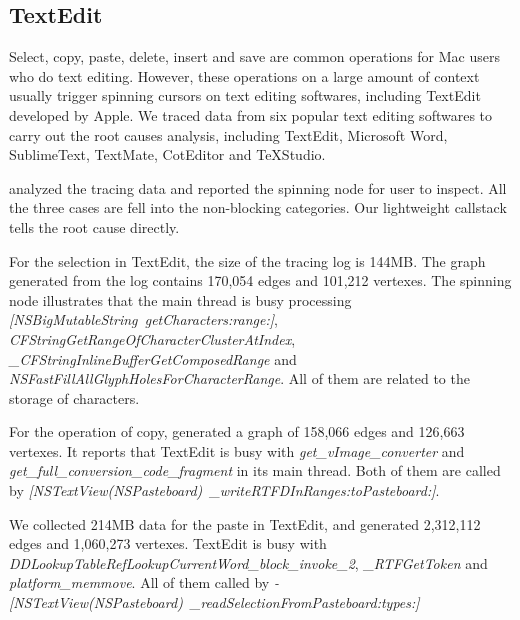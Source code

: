 \subsection{TextEdit}

Select, copy, paste, delete, insert and save are common operations for Mac
users who do text editing. However, these operations on a large amount of
context usually trigger spinning cursors on text editing softwares, including
TextEdit developed by Apple.  We traced data from six popular text editing
softwares to carry out the root causes analysis, including TextEdit, Microsoft
Word, SublimeText, TextMate, CotEditor and TeXStudio.

\xxx analyzed the tracing data and reported the spinning node for user to
inspect.  All the three cases are fell into the non-blocking categories.  Our
lightweight callstack tells the root cause directly.

For the selection in TextEdit, the size of the tracing log is 144MB.  The graph
generated from the log contains 170,054 edges and 101,212 vertexes.  The
spinning node illustrates that the main thread is busy processing
\textit{[NSBigMutableString\ getCharacters:range:]},
\textit{CFStringGetRangeOfCharacterClusterAtIndex},
\textit{\_CFStringInlineBufferGetComposedRange} and
\textit{NSFastFillAllGlyphHolesForCharacterRange}.  All of them are related to
the storage of characters.

For the operation of copy, \xxx generated a graph of 158,066 edges and 126,663
vertexes.  It reports that TextEdit is busy with
\textit{get\_vImage\_converter} and
\textit{get\_full\_conversion\_code\_fragment} in its main thread.  Both of
them are called by \textit{[NSTextView(NSPasteboard)\
\_writeRTFDInRanges:toPasteboard:]}.

We collected 214MB data for the paste in TextEdit, and generated 2,312,112
edges and 1,060,273 vertexes. TextEdit is busy with
\textit{DDLookupTableRefLookupCurrentWord\_block\_invoke\_2},
\textit{\_RTFGetToken} and \textit{platform\_memmove}. All of them called by
\textit{-[NSTextView(NSPasteboard)\ \_readSelectionFromPasteboard:types:]}
